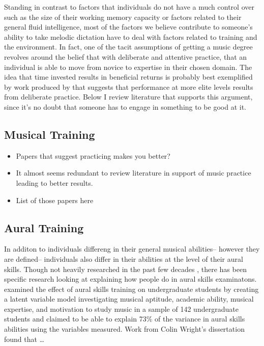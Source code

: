 \documentclass[]{book}
\begin{document}
Standing in contrast to factors that individuals do not have a much control over such as the size of their working memory capacity or factors related to their general fluid intelligence, most of the factors we believe contribute to someone's ability to take melodic dictation have to deal with factors related to training and the environment.
In fact, one of the tacit assumptions of getting a music degree revolves around the belief that with deliberate and attentive practice, that an individual is able to move from novice to expertise in their chosen domain.
The idea that time invested results in beneficial returns is probably best exemplified by work produced by \citet{ericssonRoleDeliberatePractice1993} that suggests that performance at more elite levels results from deliberate practice.
Below I review literature that supports this argument, since it's no doubt that someone has to engage in something to be good at it.

\hypertarget{musical-training}{%
\subsection{Musical Training}\label{musical-training}}

\begin{itemize}
\item
  Papers that suggest practicing makes you better?
\item
  It almost seems redundant to review literature in support of music practice leading to better results.
\item
  List of those papers here
\end{itemize}

\hypertarget{aural-training}{%
\subsection{Aural Training}\label{aural-training}}

In additon to individuals differeng in their general musical abilities-- however they are defined-- individuals also differ in their abilities at the level of their aural skills.
Though not heavily researched in the past few decades \citep{furbyEffectsPeerTutoring2016}, there has been specific research looking at explaining how people do in aural skills examinatons.
\citet{harrisonEffectsMusicalAptitude1994} examined the effect of aural skills training on undergraduate students by creating a latent variable model investigating musical aptitude, academic ability, musical expertise, and motivation to study music in a sample of 142 undergraduate students and claimed to be able to explain 73\% of the variance in aural skills abilities using the variables measured.
Work from Colin Wright's dissertation found that \ldots{} \citep{wrightInvestigatingAuralCase2016}
\end{document}
